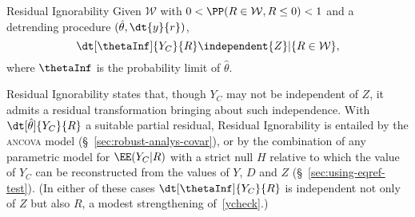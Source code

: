 \begin{ass}{Residual Ignorability}
\sloppy
Given $\mathcal{W}$ with $0< \PP( R \in
\mathcal{W}, R\leq 0) < 1$ and a detrending procedure $(\hat{\theta}, \dt{y}{r})$,
\begin{equation}\label{ycheck}
\dt[\thetaInf]{Y_{C}}{ R }%
\independent {Z}| \{R \in \mathcal{W}\},
\end{equation}
where $\thetaInf$ is the probability limit of $\hat\theta$.
\end{ass}
Residual Ignorability states that, though $Y_C$ may not be independent of
$Z$,  it admits a residual transformation bringing about such
independence.   With $\dt[\hat\theta]{Y_{C}}{ R}$ a suitable
partial residual, Residual Ignorability is entailed by the
\textsc{ancova} model (\S~\ref{sec:robust-analys-covar}), or by the combination of any parametric model
for $\EE (Y_{C}| R)$ with a strict null $H$ relative to which the
value of $Y_{C}$ can be reconstructed from the values of $Y$, $D$ and
$Z$ (\S~\ref{sec:using-eqref-test}).
(In either of these cases $\dt[\thetaInf]{Y_{C}}{ R}$
is independent not only of $Z$ but also $R$,
a modest strengthening of~\eqref{ycheck}.)

